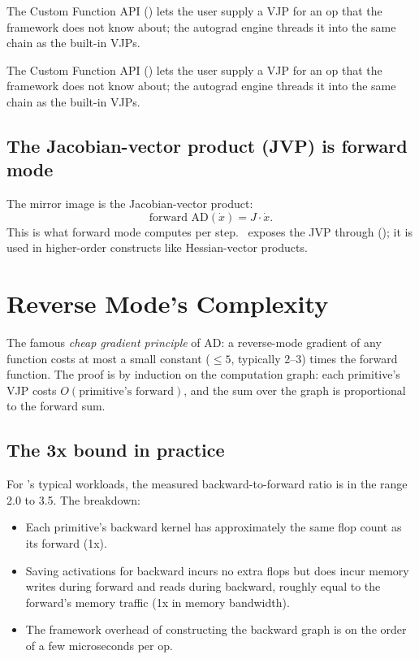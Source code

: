 The Custom Function API () lets the
user supply a VJP for an op that the framework does not know
about; the autograd engine threads it into the same chain as the
built-in VJPs.

The Custom Function API () lets the
user supply a VJP for an op that the framework does not know
about; the autograd engine threads it into the same chain as the
built-in VJPs.

\subsection{The Jacobian-vector product (JVP) is forward mode}
\label{ssec:ad_theory:jvp}

The mirror image is the Jacobian-vector product:
\[
\text{forward AD}(\dot{x}) = J \cdot \dot{x}.
\]
This is what forward mode computes per step. \Lucid\ exposes the
JVP through 
(); it is used in higher-order constructs
like Hessian-vector products.

\section{Reverse Mode's Complexity}
\label{sec:ad_theory:complexity}

The famous \emph{cheap gradient principle} of AD: a reverse-mode
gradient of any function costs at most a small constant ($\leq
5$, typically 2--3) times the forward function. The proof is by
induction on the computation graph: each primitive's VJP costs
$O(\text{primitive's forward})$, and the sum over the graph is
proportional to the forward sum.

\subsection{The 3x bound in practice}
\label{ssec:ad_theory:three_x}

For \Lucid's typical workloads, the measured backward-to-forward
ratio is in the range 2.0 to 3.5. The breakdown:

\begin{itemize}
  \item Each primitive's backward kernel has approximately the
    same flop count as its forward (1x).
  \item Saving activations for backward incurs no extra flops but
    does incur memory writes during forward and reads during
    backward, roughly equal to the forward's memory traffic
    (1x in memory bandwidth).
  \item The framework overhead of constructing the backward graph
    is on the order of a few microseconds per op.
\end{itemize}

